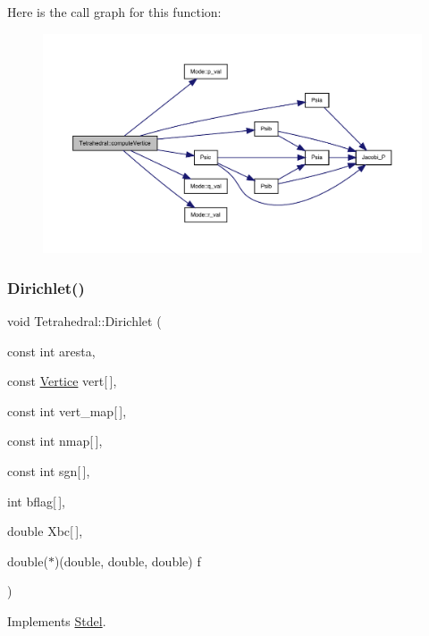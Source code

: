 Here is the call graph for this function\+:
\nopagebreak
\begin{figure}[H]
\begin{center}
\leavevmode
\includegraphics[width=350pt]{classTetrahedral_a0cb9858197838f9f018e41a0ccd881c5_cgraph}
\end{center}
\end{figure}
\mbox{\label{classTetrahedral_afa5ab92fac0ada8385fddf3ddec3a8fc}} 
\subsubsection{\texorpdfstring{Dirichlet()}{Dirichlet()}}
{\footnotesize\ttfamily void Tetrahedral\+::\+Dirichlet (\begin{DoxyParamCaption}\item[{const int}]{aresta,  }\item[{const \hyperlink{structVertice}{Vertice}}]{vert\mbox{[}$\,$\mbox{]},  }\item[{const int}]{vert\+\_\+map\mbox{[}$\,$\mbox{]},  }\item[{const int}]{nmap\mbox{[}$\,$\mbox{]},  }\item[{const int}]{sgn\mbox{[}$\,$\mbox{]},  }\item[{int}]{bflag\mbox{[}$\,$\mbox{]},  }\item[{double}]{Xbc\mbox{[}$\,$\mbox{]},  }\item[{double($\ast$)(double, double, double)}]{f }\end{DoxyParamCaption})\hspace{0.3cm}{\ttfamily [virtual]}}



Implements \hyperlink{classStdel_a92e13b000249ba73b35407d925cbd7a8}{Stdel}.



